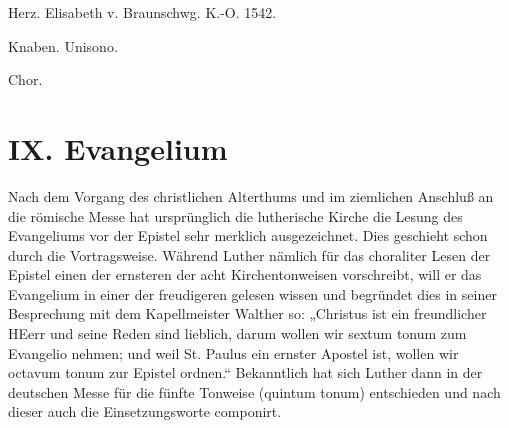 Herz. Elisabeth v. Braunschwg. K.-O. 1542.

Knaben. Unisono.


Chor.


\chapter{IX. Evangelium}


Nach dem Vorgang des christlichen Alterthums und im ziemlichen Anschluß an die römische Messe hat ursprünglich die lutherische Kirche die Lesung des Evangeliums vor der Epistel sehr merklich ausgezeichnet. Dies geschieht schon durch die Vortragsweise. Während Luther nämlich für das choraliter Lesen der Epistel einen der ernsteren der acht Kirchentonweisen vorschreibt, will er das Evangelium in einer der freudigeren gelesen wissen und begründet dies in seiner Besprechung mit dem Kapellmeister Walther so: „Christus ist ein freundlicher HEerr und seine Reden sind lieblich, darum wollen wir sextum tonum zum Evangelio nehmen; und weil St. Paulus ein ernster Apostel ist, wollen wir octavum tonum zur Epistel ordnen.“ Bekanntlich hat sich Luther dann in der deutschen Messe für die fünfte Tonweise (quintum tonum) entschieden und nach dieser auch die Einsetzungsworte componirt.

